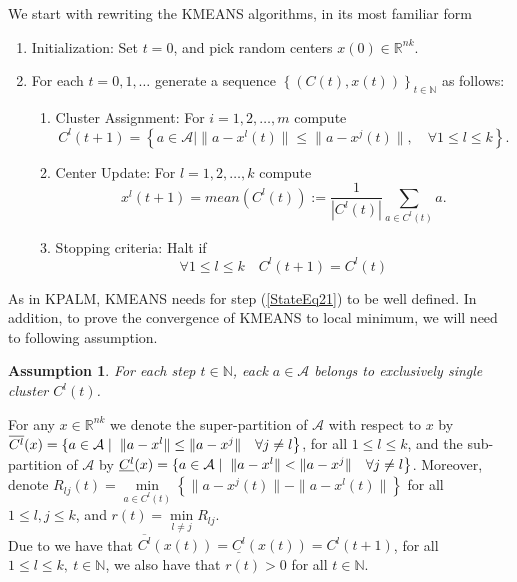 \documentclass[11pt]{article}
\numberwithin{equation}{section}
\newtheorem{assumption}{Assumption}
\begin{document}
We start with rewriting the KMEANS algorithms, in its most familiar form
\begin{enumerate}[(1)]
	\item Initialization: Set $t=0$, and pick random centers $x(0) \in \mathbb{R}^{nk}$.

	\item For each $t=0,1, \ldots$ generate a sequence $\left\lbrace (C(t),x(t))\right\rbrace_{t \in \mathbb{N}}$ as follows:
	\begin{enumerate}[(2.1)]
		\item Cluster Assignment: For $i=1, 2, \ldots ,m$ compute
		\begin{equation}
			C^l(t+1) = \left\lbrace a \in \mathcal{A} \mid \| a - x^l(t) \| \leq \|a - x^j(t) \|, \quad \forall 1 \leq l \leq k \right\rbrace . \label{StateEq20}
		\end{equation}
		
		\item Center Update: For $l=1, 2, \ldots ,k$ compute
		\begin{equation}
			x^l(t+1) = mean(C^l(t)) := \frac{1}{\left| C^l(t) \right|} \sum\limits_{a \in C^l(t)} a . \label{StateEq21}
		\end{equation}
		
		\item Stopping criteria: Halt if 
		\begin{equation}
			\forall 1 \leq l \leq k \quad C^l(t+1)=C^l(t) \label{StateEq22}
		\end{equation}
	\end{enumerate}
\end{enumerate}
As in KPALM, KMEANS needs  for step (\ref{StateEq21}) to be well defined. In addition, to prove the convergence of KMEANS to local minimum, we will need to following assumption.

\begin{assumption} \label{StateEq23}
For each step $t \in \mathbb{N}$, eack $a \in \mathcal{A}$ belongs to exclusively single cluster $C^l(t)$.
\end{assumption}

For any $x \in \mathbb{R}^{nk}$ we denote the super-partition of $\mathcal{A}$ with respect to $x$ by $\overline{C^l}(x) = \left\lbrace a \in \mathcal{A} \mid \right. \\ \left. \|a - x^l\| \leq \|a - x^j\| \quad \forall j \neq l \right\rbrace$, for all $1 \leq l \leq k$, and the sub-partition of $\mathcal{A}$ by $\underline{C^l}(x) = \left\lbrace a \in \mathcal{A} \mid \right. \\ \left. \|a - x^l\| < \|a - x^j\| \quad \forall j \neq l \right\rbrace$.
Moreover, denote $R_{lj}(t) = \min\limits_{a \in C^l(t)} \left\lbrace \|a - x^j(t)\| - \|a - x^l(t)\| \right\rbrace$ for all $1 \leq l,j \leq k$, and $r(t) = \min\limits_{l \neq j} R_{lj}$. \\
Due to  we have that $\overline{C^l}(x(t)) = \underline{C^l}(x(t)) = C^l(t+1)$, for all $1 \leq l \leq k, \: t \in \mathbb{N}$, we also have that $r(t) > 0$ for all $t \in \mathbb{N}$.
\end{document}
